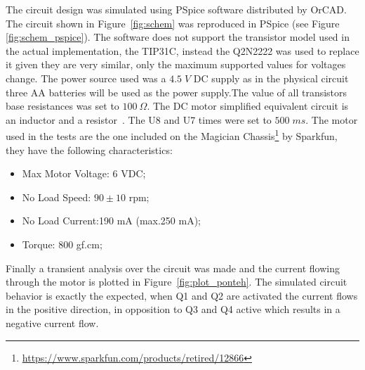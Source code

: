     The circuit design was simulated using PSpice software distributed by OrCAD. The circuit shown in Figure~\ref{fig:schem} was reproduced in PSpice (see Figure \ref{fig:schem_pspice}). The software does not support the transistor model used in the actual implementation, the TIP31C, instead the Q2N2222 was used to replace it given they are very similar, only the maximum supported values for voltages change. The power source used was a $4.5\;V$ DC supply as in the physical circuit three AA batteries will be used as the power supply.The value of all transistors base resistances was set to $100\:\Omega$. The DC motor simplified equivalent circuit is an inductor and a resistor~\cite{CHAPMAN}. The U8 and U7 times were set to $500\; ms$.\newline
    The motor used in the tests are the one included on the Magician Chassis\footnote{\url{https://www.sparkfun.com/products/retired/12866}} by Sparkfun, they have the following characteristics:
    \begin{itemize}
        \item Max Motor Voltage: 6 VDC;
        \item No Load Speed: $90\pm10$ rpm;
        \item No Load Current:190 mA (max.250 mA);
        \item Torque: 800 gf.cm;
    \end{itemize}
	Finally a transient analysis over the circuit was made and the current flowing through the motor is plotted in Figure~\ref{fig:plot_ponteh}. The simulated circuit behavior is exactly the expected, when Q1 and Q2 are activated the current flows in the positive direction, in opposition to Q3 and Q4 active which results in a negative current flow.
	


